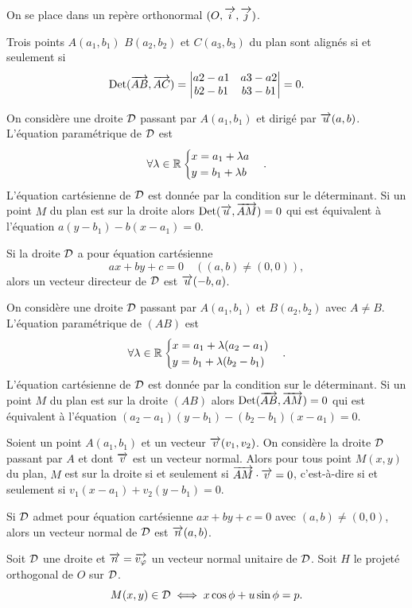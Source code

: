 On se place dans un repère orthonormal $(O,\overrightarrow{i},\overrightarrow{j})$.
\begin{prop}
Trois points $A(a_1,b_1)$ $B(a_2,b_2)$ et $C(a_3,b_3)$ du plan sont alignés si et seulement si
\begin{equation}
  \operatorname{Det}(\overrightarrow{AB},\overrightarrow{AC})=
  \begin{vmatrix}
    a2-a1&a3-a2\\
    b2-b1&b3-b1
  \end{vmatrix} =0.
\end{equation}
\end{prop}
\begin{prop}
On considère une droite $\mathcal{D}$ passant par $A(a_1,b_1)$ et dirigé par $\overrightarrow{u}(a,b)$. L'équation paramétrique de $\mathcal{D}$ est
\begin{equation}
 \forall \lambda \in \mathbb{R} \begin{cases} x=a_1+\lambda a \\ y=b_1+ \lambda b\end{cases}. 
\end{equation}
L'équation cartésienne de $\mathcal{D}$ est donnée par la condition sur le déterminant. Si un point $M$ du plan est sur la droite alors $\operatorname{Det}(\overrightarrow{u},\overrightarrow{AM})=0$ qui est équivalent à l'équation $a(y-b_1)-b(x-a_1)=0$.
\end{prop}
Si la droite $\mathcal{D}$ a pour équation cartésienne
\begin{equation}
 ax+by+c=0 \quad ((a,b) \neq (0,0)),
\end{equation}
alors un vecteur directeur de $\mathcal{D}$ est $\overrightarrow{u}(-b,a)$.
\begin{prop}
  On considère une droite $\mathcal{D}$ passant par $A(a_1,b_1)$ et $B(a_2,b_2)$ avec $A \neq B$. L'équation paramétrique de $(AB)$ est
  \begin{equation}
    \forall \lambda \in \mathbb{R} \begin{cases} x=a_1+\lambda (a_2-a_1) \\ y=b_1+ \lambda (b_2-b_1)\end{cases}.
  \end{equation}
L'équation cartésienne de $\mathcal{D}$ est donnée par la condition sur le déterminant. Si un point $M$ du plan est sur la droite $(AB)$ alors $\operatorname{Det}(\overrightarrow{AB},\overrightarrow{AM})=0$ qui est équivalent à l'équation $(a_2-a_1)(y-b_1)-(b_2-b_1)(x-a_1)=0$.
\end{prop}
\begin{prop}
  Soient un point $A(a_1,b_1)$ et un vecteur $\overrightarrow{v}(v_1,v_2)$. On considère la droite $\mathcal{D}$ passant par $A$ et dont $\overrightarrow{v}$ est un vecteur normal. Alors pour tous point $M(x,y)$ du plan, $M$ est sur la droite si et seulement si $\overrightarrow{AM}\cdot\overrightarrow{v}=0$, c'est-à-dire si et seulement si $v_1(x-a_1)+v_2(y-b_1)=0$.
\end{prop}
Si $\mathcal{D}$ admet pour équation cartésienne $ax+by+c=0$ avec $(a,b) \neq (0,0)$, alors un vecteur normal de $\mathcal{D}$ est $\overrightarrow{n}(a,b)$.
\begin{prop}
  Soit $\mathcal{D}$ une droite et $\overrightarrow{n}=\overrightarrow{v_\varphi}$ un vecteur normal unitaire de $\mathcal{D}$. Soit $H$ le projeté orthogonal de $O$ sur $\mathcal{D}$.
  \begin{equation}
    M(x,y) \in \mathcal{D} \iff x\cos\phi + u \sin\phi=p.
  \end{equation}
\end{prop}

